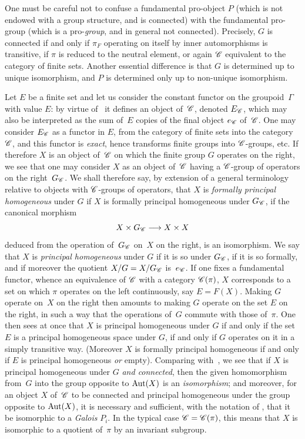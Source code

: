 \begin{remark}
\label{V.5.11}
One must be careful not to confuse a fundamental pro-object $P$ (which is not
endowed with a group structure, and is connected) with the fundamental
pro-group (which is a pro-\emph{group}, and in general not
connected). Precisely, $G$ is connected if
and
only if $\pi_F$ operating on itself by inner
automorphisms is transitive, \ie if $\pi$ is reduced to
the neutral element, or again $\cal{C}$ equivalent to the
category of finite sets. Another
essential difference is that $G$ is determined up to
unique isomorphism, and $P$ is determined only up to
non-unique isomorphism.

Let $E$ be a finite set and let us consider the constant functor on
the groupoid~$\Gamma$ with value $E$: by virtue
of~ it defines an object of~$\cal{C}$, denoted $E_{\cal{C}}$, which
may also be interpreted as the sum of~$E$ copies of
the final object $e_{\cal{C}}$ of~$\cal{C}$. One may consider
$E_{\cal{C}}$ as a functor in $E$, from the category of
finite sets into the category $\cal{C}$, and this functor is
\emph{exact}, hence transforms finite groups into $\cal{C}$-groups,
etc. If therefore $X$ is an object of~$\cal{C}$ on which the finite group
$G$ operates on the right, we see that one may consider $X$
as an object of~$\cal{C}$ having a $\cal{C}$-group of operators
on the right~$G_{\cal{C}}$. We shall therefore say, by extension of a
general terminology relative to objects with
$\cal{C}$-groups of operators, that $X$ is \emph{formally
principal homogeneous}
under $G$ if $X$ is formally principal homogeneous under
$G_{\cal{C}}$, \ie if the canonical morphism
$$
X\times G_{\cal{C}} \to X\times X
$$
deduced from the operation of~$G_{\cal{C}}$ on~$X$ on the right,
is an isomorphism. We say that $X$ is \emph{principal homogeneous}
under $G$ if it is so under $G_{\cal{C}}$, \ie if it is so formally,
and if moreover the quotient $X/G=X/G_{\cal{C}}$ is~$e_{\cal{C}}$. If one
fixes a fundamental functor, whence an equivalence of
$\cal{C}$ with a category $\cal{C}(\pi)$, $X$ corresponds to
a set on which $\pi$ operates on the left continuously,
say $E=F(X)$. Making $G$ operate on~$X$ on the right then amounts
to making $G$ operate on the set $E$ on the right, in such a way that the operations of~$G$ commute with those of~$\pi$. One
then sees at once that $X$ is principal homogeneous under
$G$ if and only if the set $E$ is a principal
homogeneous space
under $G$,
\ie if and only if $G$ operates on it in a simply transitive way. (Moreover $X$ is formally
principal homogeneous if and only if
$E$ is principal homogeneous \emph{or} empty). Comparing
with~, we see that if $X$ is principal homogeneous under
$G$ \emph{and connected}, then the given homomorphism from~$G$ into the
group opposite to $\operatorname{Aut}(X)$ is an \emph{isomorphism}; and
moreover, for an object $X$
of~$\cal{C}$
to be connected and principal homogeneous under the group opposite to
$\operatorname{Aut}(X)$, it is necessary and sufficient, with the notation of \No {}, that it
be isomorphic to a \emph{Galois} $P_i$. In the typical case
$\cal{C}=\cal{C}(\pi)$, this means that $X$ is isomorphic to a
quotient of~$\pi$ by an invariant subgroup.


\end{remark}
